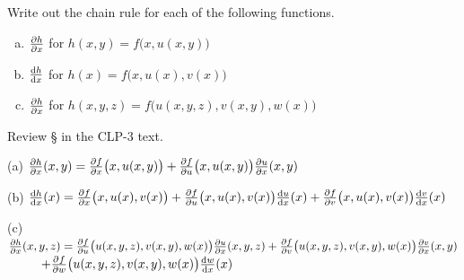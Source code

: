 


\subsection*{\Conceptual}

\begin{question}
Write out the chain rule
for each of the following functions.
\begin{enumerate}[(a)]
\item
   $\pdiff{h}{x}$ for $h(x,y)=f\big(x,u(x,y)\big)$
\item
   $\diff{h}{x}$ for $h(x)=f\big(x,u(x),v(x)\big)$
\item
   $\pdiff{h}{x}$ for $h(x,y,z)=f\big(u(x,y,z),v(x,y),w(x)\big)$
\end{enumerate}
\end{question}

\begin{hint}
 Review   \S{} in the CLP-3 text.
\end{hint}

\begin{answer}
(a) $\pdiff{h}{x}(x,y)
=\pdiff{f}{x}\big(x,u(x,y)\big)
+\pdiff{f}{u}\big(x,u(x,y)\big)
\pdiff{u}{x}(x,y)$

(b) $\diff{h}{x}(x)
=\pdiff{f}{x}\big(x,u(x),v(x)\big)
+\pdiff{f}{u}\big(x,u(x),v(x)\big)
\diff{u}{x}(x)
+\pdiff{f}{v}\big(x,u(x),v(x)\big)
\diff{v}{x}(x)$

(c) $\pdiff{h}{x}(x,y,z)
=\pdiff{f}{u}\big(u(x,y,z),v(x,y),w(x)\big)
\pdiff{u}{x}(x,y,z)
+\pdiff{f}{v}\big(u(x,y,z),v(x,y),w(x)\big)
\pdiff{v}{x}(x,y)$ 
\null$\ \ \ \ \ \ \ \ +\pdiff{f}{w}\big(u(x,y,z),v(x,y),w(x)\big)
\diff{w}{x}(x)$


\end{answer}

